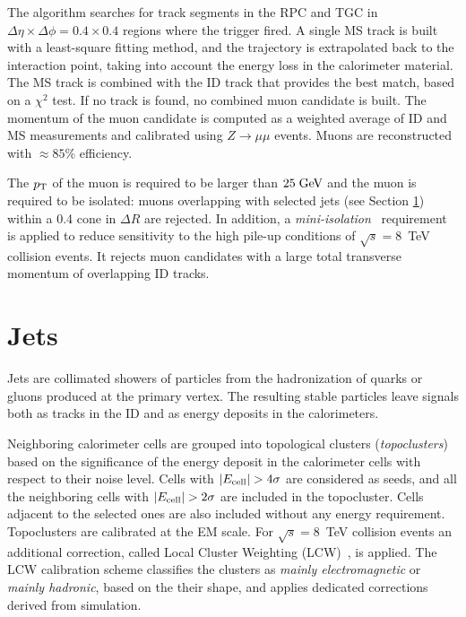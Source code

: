The algorithm searches for track segments in the RPC and TGC in
$\Delta\eta\times\Delta\phi=0.4\times0.4$ regions where the trigger
fired. A single MS track is built with a least-square fitting method, and
the trajectory is extrapolated back to the interaction point, taking
into account the energy loss in the calorimeter material. 
The MS track is combined with the ID track that provides the best
match, based on a $\chi^2$ test. If no track is found, no combined
muon candidate is built.
The momentum of the muon candidate is computed as a weighted average
of ID and MS measurements and calibrated using $Z\to \mu\mu$ events.
Muons are reconstructed with \mbox{$\approx{}85\%$} efficiency.

The $p_{\mathrm{T}}$ of the muon is required to be larger than \mbox{$25 \; \mathrm{GeV}{}$}
and the muon is required to be isolated: muons overlapping with selected
jets (see Section \ref{sec:jets}) within a 0.4 cone in $\Delta R$ are
rejected. In addition, a {\it mini-isolation}~\cite{miniisolation}
requirement is applied to reduce sensitivity to the high pile-up
conditions of $\sqrt{s} = $8~TeV collision events. It rejects muon candidates
with a large total transverse momentum of overlapping ID tracks.

\section{Jets}
\label{sec:jets}

Jets are collimated showers of particles from the hadronization of
quarks or gluons produced at the primary vertex.
The resulting stable particles leave signals both as tracks in the ID
and as energy deposits in the calorimeters.

Neighboring calorimeter cells are grouped into topological clusters
({\it topoclusters}) based on the significance of the energy deposit
in the calorimeter cells with respect to their noise
level. Cells with $|E_{\rm cell}|>4\sigma$ are considered as seeds, and
all the neighboring cells with $|E_{\rm cell}| > 2\sigma$ are included
in the topocluster. Cells adjacent to the selected ones are also
included without any energy requirement.
Topoclusters are calibrated at the EM scale. For $\sqrt{s} = $8~TeV
collision events an additional correction, called Local Cluster
Weighting (LCW)~\cite{lcwcalib}, is applied. The LCW calibration
scheme classifies the clusters as {\it mainly electromagnetic} or
{\it mainly hadronic}, based on the their shape, and applies
dedicated corrections derived from simulation.

